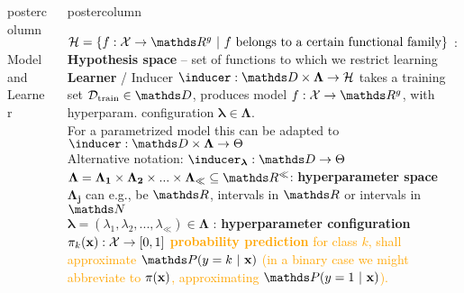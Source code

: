 \documentclass{beamer}
\newlength{\columnheight} %
\begin{document}
\begin{frame}[fragile]{}
\begin{columns}
\begin{column}{.31\textwidth}
\begin{beamercolorbox}[center]{postercolumn}
\begin{minipage}{.98\textwidth}
{\begin{myblock}{Model and Learner}
\end{myblock}\vfill
				}
			\end{minipage}
		\end{beamercolorbox}
	\end{column}
	\begin{column}{.31\textwidth}
		\begin{beamercolorbox}[center]{postercolumn}
			\begin{minipage}{.98\textwidth}
				\parbox[t][\columnheight]{\textwidth}{
\begin{myblock}{} \vspace{-4ex}
$\Hspace = \{f : \Xspace \rightarrow \R^g ~|~ f \text{ belongs to a certain functional family}\}$ : \\ \textbf{Hypothesis space} -- set of functions to which we restrict learning 	\\

\textbf{Learner} / Inducer $\inducer: \preimageInducerShort \rightarrow \Hspace$  takes a training set  $\Dtrain \in \allDatasets$, produces model $f : \Xspace \rightarrow \R^g$, with hyperparam. configuration $\bm{\lambda} \in \bm{\Lambda}$.\\
For a parametrized model this can be adapted to $\inducer: \preimageInducerShort \rightarrow \Theta$ \\
Alternative notation: $\inducer_{\bm{\lambda} }: \allDatasets \rightarrow \Theta$ \\

$\bm{\Lambda} = \bm{\Lambda_1} \times \bm{\Lambda_2} \times ... \times \bm{\Lambda_}{\ll} \subseteq \R^{\ll}$: %
\textbf{hyperparameter space} \\
$\bm{\Lambda_j} $ can e.g., be $\R$, intervals in $\R$ or intervals in $\N$\\

$\bm{\lambda} = (\lambda_1, \lambda_2, ..., \lambda_{\ll}) \in \bm{\Lambda}$ : \textbf{hyperparameter configuration} \\

\textcolor{orange}{
$\pi_{k}(\mathbf{x}) : \mathcal{X} \rightarrow [0,1]$ \textbf{probability prediction} for class $k$, shall approximate $\postk$
 (in a binary case we might abbreviate to $\pi(\mathbf{x})$, approximating $\post$). }\\
 

\end{myblock}}
\end{minipage}
\end{beamercolorbox}
\end{column}
\end{columns}
\end{frame}
\end{document}
